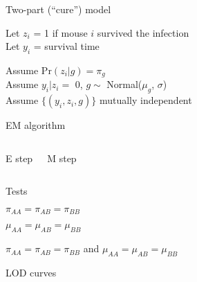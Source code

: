 \documentclass[aspectratio=169,12pt,t]{beamer}
\begin{document}
\begin{frame}{Two-part (``cure'') model}

  \bbi
  \itemsep24pt

  \item Let $z_i$ = 1 if mouse $i$ survived the infection \\[12pt]

  {\color{background} Let} $y_i$ = survival time

\item Assume $\text{Pr}(z_i|g) = \pi_g$ \\[12pt]

  {\color{background} Assume} $y_i | z_i=$ 0, $g \sim$ Normal($\mu_g$,
  $\sigma$) \\[12pt]

  {\color{background} Assume} $\{(y_i, z_i, g)\}$ mutually independent

  \ei

\end{frame}



\begin{frame}{EM algorithm}

  \begin{columns}


    {\hilit E step}

    \bigskip




    {\hilit M step}

    \bigskip



  \end{columns}

\end{frame}



\begin{frame}{Tests}

  \bbi
\item $\pi_{AA} = \pi_{AB} = \pi_{BB}$
\item $\mu_{AA} = \mu_{AB} = \mu_{BB}$
\item $\pi_{AA} = \pi_{AB} = \pi_{BB}$ and $\mu_{AA} = \mu_{AB} = \mu_{BB}$
  \ei


\end{frame}


\begin{frame}[c]{LOD curves}
\end{frame}
\end{document}
